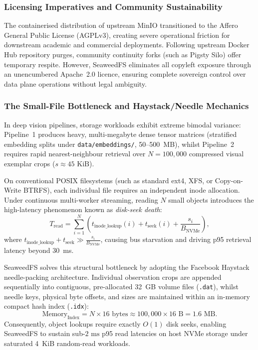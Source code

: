 \subsubsection{Licensing Imperatives and Community Sustainability}
The containerised distribution of upstream MinIO transitioned to the Affero General Public License (AGPLv3), creating severe operational friction for downstream academic and commercial deployments. Following upstream Docker Hub repository purges, community continuity forks (such as Pigsty Silo) offer temporary respite. However, SeaweedFS eliminates all copyleft exposure through an unencumbered Apache~2.0 licence, ensuring complete sovereign control over data plane operations without legal ambiguity.

\subsubsection{The Small-File Bottleneck and Haystack/Needle Mechanics}
In deep vision pipelines, storage workloads exhibit extreme bimodal variance: Pipeline~1 produces heavy, multi-megabyte dense tensor matrices (stratified embedding splits under \texttt{data/embeddings/}, 50--500~MB), whilst Pipeline~2 requires rapid nearest-neighbour retrieval over $N = 100{,}000$ compressed visual exemplar crops ($s \approx 45\text{ KiB}$).

On conventional POSIX filesystems (such as standard ext4, XFS, or Copy-on-Write BTRFS), each individual file requires an independent inode allocation. Under continuous multi-worker streaming, reading $N$ small objects introduces the high-latency phenomenon known as \textit{disk-seek death}:
\[
T_{\text{read}} = \sum_{i=1}^{N} \left( t_{\text{inode\_lookup}}(i) + t_{\text{seek}}(i) + \frac{s_i}{B_{\text{NVMe}}} \right),
\]
where $t_{\text{inode\_lookup}} + t_{\text{seek}} \gg \frac{s_i}{B_{\text{NVMe}}}$, causing bus starvation and driving p95 retrieval latency beyond 30~ms.

SeaweedFS solves this structural bottleneck by adopting the Facebook Haystack needle-packing architecture. Individual observation crops are appended sequentially into contiguous, pre-allocated 32~GB volume files (\texttt{.dat}), whilst needle keys, physical byte offsets, and sizes are maintained within an in-memory compact hash index (\texttt{.idx}):
\[
\text{Memory}_{\text{Index}} = N \times 16 \text{ bytes} \approx 100{,}000 \times 16\text{ B} = 1.6\text{ MB}.
\]
Consequently, object lookups require exactly $O(1)$ disk seeks, enabling SeaweedFS to sustain sub-$2\text{ ms}$ p95 read latencies on host NVMe storage under saturated 4~KiB random-read workloads.

